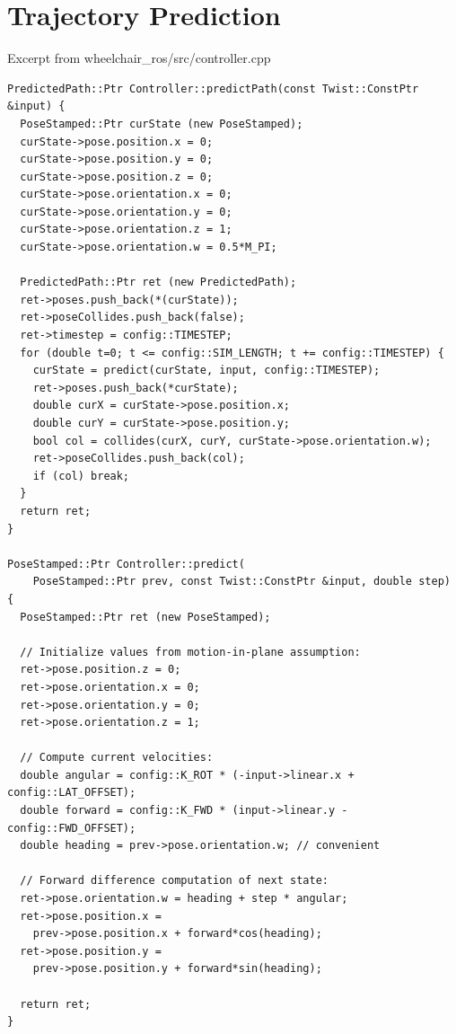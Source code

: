 \documentclass[oneside,final,a4paper]{report}
\begin{document}
\clearpage
\section{Trajectory Prediction}
\label{appendix:trajectory_prediction}
Excerpt from wheelchair\_ros/src/controller.cpp

\begin{lstlisting}
PredictedPath::Ptr Controller::predictPath(const Twist::ConstPtr &input) {
  PoseStamped::Ptr curState (new PoseStamped);
  curState->pose.position.x = 0;
  curState->pose.position.y = 0;
  curState->pose.position.z = 0;
  curState->pose.orientation.x = 0;
  curState->pose.orientation.y = 0;
  curState->pose.orientation.z = 1;
  curState->pose.orientation.w = 0.5*M_PI;

  PredictedPath::Ptr ret (new PredictedPath);
  ret->poses.push_back(*(curState));
  ret->poseCollides.push_back(false);
  ret->timestep = config::TIMESTEP;
  for (double t=0; t <= config::SIM_LENGTH; t += config::TIMESTEP) {
    curState = predict(curState, input, config::TIMESTEP);
    ret->poses.push_back(*curState);
    double curX = curState->pose.position.x;
    double curY = curState->pose.position.y;
    bool col = collides(curX, curY, curState->pose.orientation.w);
    ret->poseCollides.push_back(col);
    if (col) break;
  }
  return ret;
}

PoseStamped::Ptr Controller::predict(
    PoseStamped::Ptr prev, const Twist::ConstPtr &input, double step) 
{
  PoseStamped::Ptr ret (new PoseStamped);

  // Initialize values from motion-in-plane assumption:
  ret->pose.position.z = 0;
  ret->pose.orientation.x = 0;
  ret->pose.orientation.y = 0;
  ret->pose.orientation.z = 1;

  // Compute current velocities:
  double angular = config::K_ROT * (-input->linear.x + config::LAT_OFFSET);
  double forward = config::K_FWD * (input->linear.y - config::FWD_OFFSET); 
  double heading = prev->pose.orientation.w; // convenient

  // Forward difference computation of next state:
  ret->pose.orientation.w = heading + step * angular;
  ret->pose.position.x = 
    prev->pose.position.x + forward*cos(heading);
  ret->pose.position.y =
    prev->pose.position.y + forward*sin(heading);

  return ret;
}
\end{lstlisting}
\end{document}
